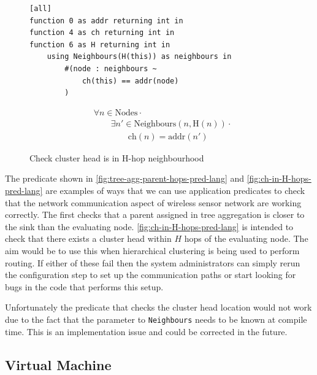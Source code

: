 \begin{figure}[H]
\begin{minipage}{.5\linewidth}
\begin{lstlisting}
[all]
function 0 as addr returning int in
function 4 as ch returning int in
function 6 as H returning int in
    using Neighbours(H(this)) as neighbours in
        #(node : neighbours ~
            ch(this) == addr(node)
        )
\end{lstlisting}
\end{minipage}%
\begin{minipage}{.5\linewidth}
\begin{align*}
&				\forall n \in \text{Nodes} \cdot \\
& \hspace{2em}		\exists n' \in \text{Neighbours}(n, \text{H}(n)) \cdot \\
& \hspace{4em}			\text{ch}(n) = \text{addr}(n')
\end{align*}
\end{minipage}
\caption{Check cluster head is in H-hop neighbourhood}
\label{fig:ch-in-H-hops-pred-lang}
\end{figure}

The predicate shown in \autoref{fig:tree-agg-parent-hops-pred-lang} and \autoref{fig:ch-in-H-hops-pred-lang} are examples of ways that we can use application predicates to check that the network communication aspect of wireless sensor network are working correctly. The first checks that a parent assigned in tree aggregation is closer to the sink than the evaluating node. \autoref{fig:ch-in-H-hops-pred-lang} is intended to check that there exists a cluster head within $H$ hops of the evaluating node. The aim would be to use this when hierarchical clustering is being used to perform routing. If either of these fail then the system administrators can simply rerun the configuration step to set up the communication paths or start looking for bugs in the code that performs this setup.

Unfortunately the predicate that checks the cluster head location would not work due to the fact that the parameter to \verb|Neighbours| needs to be known at compile time. This is an implementation issue and could be corrected in the future.


\subsection{Virtual Machine}

